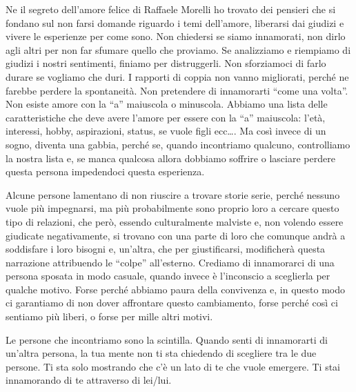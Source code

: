 \documentclass[12pt]{book} %
\begin{document}
Ne il segreto dell'amore felice di Raffaele Morelli ho trovato dei
pensieri che si fondano sul non farsi domande riguardo i temi dell'amore, liberarsi dai giudizi e
vivere le esperienze per come sono. Non chiedersi se siamo innamorati, non dirlo agli altri per non far sfumare quello
che proviamo. Se analizziamo e riempiamo di giudizi i nostri sentimenti, finiamo per distruggerli. Non sforziamoci di
farlo durare se vogliamo che duri. I rapporti di coppia non vanno migliorati, perché ne farebbe perdere la spontaneità.
Non pretendere di innamorarti “come una volta”. Non esiste amore con la “a” maiuscola o minuscola. Abbiamo una lista
delle caratteristiche che deve avere l'amore per essere con la “a” maiuscola:
l'età, interessi, hobby, aspirazioni, status, se vuole figli ecc…. Ma così invece di un sogno,
diventa una gabbia, perché se, quando incontriamo qualcuno, controlliamo la nostra lista e, se manca qualcosa allora
dobbiamo soffrire o lasciare perdere questa persona impedendoci questa esperienza.

Alcune persone lamentano di non riuscire a trovare storie serie, perché nessuno vuole più
impegnarsi, ma più probabilmente sono proprio loro a cercare questo tipo di relazioni, che però, essendo culturalmente
malviste e, non volendo essere giudicate negativamente, si trovano con una parte di loro che comunque andrà a
soddisfare i loro bisogni e, un'altra, che per giustificarsi, modificherà questa narrazione
attribuendo le “colpe” all'esterno. Crediamo di innamorarci di una persona sposata in modo
casuale, quando invece è l'inconscio a sceglierla per qualche motivo. Forse perché abbiamo paura
della convivenza e, in questo modo ci garantiamo di non dover affrontare questo cambiamento, forse perché così ci
sentiamo più liberi, o forse per mille altri motivi.

Le persone che incontriamo sono la scintilla. Quando senti di innamorarti di un'altra persona, la tua mente non ti sta chiedendo di
scegliere tra le due persone. Ti sta solo mostrando che c'è un lato di te che vuole emergere. Ti stai innamorando di te attraverso di
lei/lui. 
\end{document}
